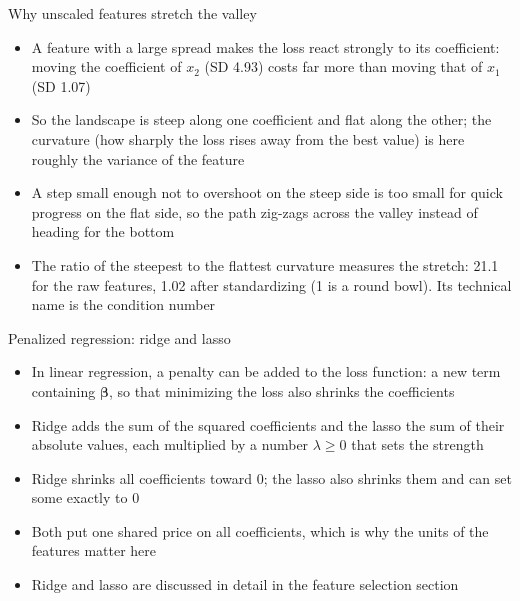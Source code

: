 \begin{frame}{Why unscaled features stretch the valley}
    \begin{itemize}
        \item A feature with a large spread makes the loss react strongly to its coefficient: moving the coefficient of $x_2$ (SD 4.93) costs far more than moving that of $x_1$ (SD 1.07)
        \item So the landscape is steep along one coefficient and flat along the other; the curvature (how sharply the loss rises away from the best value) is here roughly the variance of the feature
        \item A step small enough not to overshoot on the steep side is too small for quick progress on the flat side, so the path zig-zags across the valley instead of heading for the bottom
        \item The ratio of the steepest to the flattest curvature measures the stretch: 21.1 for the raw features, 1.02 after standardizing (1 is a round bowl). Its technical name is the condition number
    \end{itemize}
\end{frame}

\begin{frame}{Penalized regression: ridge and lasso}
    \begin{itemize}
        \item In linear regression, a penalty can be added to the loss function: a new term containing $\boldsymbol{\beta}$, so that minimizing the loss also shrinks the coefficients
        \item Ridge adds the sum of the squared coefficients and the lasso the sum of their absolute values, each multiplied by a number $\lambda \ge 0$ that sets the strength
        \item Ridge shrinks all coefficients toward 0; the lasso also shrinks them and can set some exactly to 0
        \item Both put one shared price on all coefficients, which is why the units of the features matter here
        \item Ridge and lasso are discussed in detail in the feature selection section
    \end{itemize}
\end{frame}

